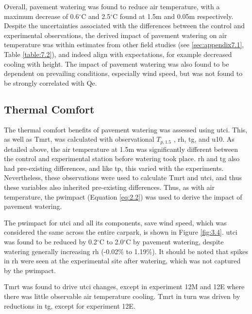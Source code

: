 \documentclass[final,3p,times,authoryear]{elsarticle}
\begin{document}
Overall, pavement watering was found to reduce air temperature, with a maximum
decrease of 0.6$^{\circ}$C and 2.5$^{\circ}$C found at 1.5m and 0.05m respectively. Despite the uncertainties associated with the differences between the control and experimental observations, the derived impact of pavement watering on air temperature was within estimates from other field studies (see \ref{sec:appendix7.1}, Table \ref{table:7.2}), and indeed align with expectations, for example decreased cooling with height. The impact of pavement watering was also found to be dependent on prevailing conditions, especially wind speed, but was not found to be strongly correlated with \gls{Qe}.

\subsection{Thermal Comfort}\label{sec:discussion3.2}

The thermal comfort benefits of pavement watering was assessed using \gls{utci}. This, as
well as \gls{Tmrt}, was calculated with observational $T_{p,1.5}$ , \gls{rh}, \gls{tg}, and \gls{u10}. As detailed above, the air temperature at 1.5m was significantly different between the control and experimental station before watering took place. \gls{rh} and \gls{tg} also had pre-existing differences, and like \gls{tp}, this varied with the experiments. Nevertheless, these observations were used to calculate \gls{Tmrt} and \gls{utci}, and thus these variables also inherited pre-existing differences. Thus, as with air temperature, the \gls{pwimpact} (Equation \ref{eq:2.2}) was used to derive the impact of pavement watering.

The \gls{pwimpact} for \gls{utci} and all its components, save wind speed, which was considered the same across the entire carpark, is shown in Figure \ref{fig:3.4}. \gls{utci} was found to be reduced by 0.2$^{\circ}$C to 2.0$^{\circ}$C by pavement watering, despite watering generally increasing \gls{rh} (-0.02\% to 1.19\%). It should be noted that spikes in \gls{rh} were seen at the experimental site after watering, which was not captured by the \gls{pwimpact}.

\gls{Tmrt} was found to drive \gls{utci} changes, except in experiment 12M and 12E where there was little observable air temperature cooling. \gls{Tmrt} in turn was driven by reductions in \gls{tg}, except for experiment 12E.
\end{document}
